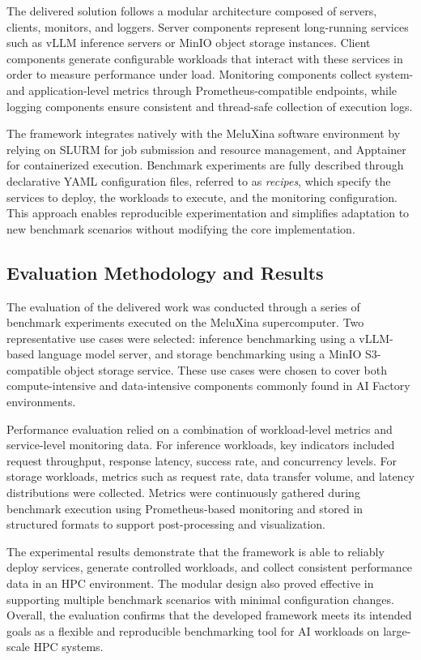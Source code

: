 \documentclass[11pt,a4paper]{article}
\begin{document}
The delivered solution follows a modular architecture composed of servers, clients, monitors, and loggers. Server components represent long-running services such as vLLM inference servers or MinIO object storage instances. Client components generate configurable workloads that interact with these services in order to measure performance under load. Monitoring components collect system- and application-level metrics through Prometheus-compatible endpoints, while logging components ensure consistent and thread-safe collection of execution logs.

The framework integrates natively with the MeluXina software environment by relying on SLURM for job submission and resource management, and Apptainer for containerized execution. Benchmark experiments are fully described through declarative YAML configuration files, referred to as \emph{recipes}, which specify the services to deploy, the workloads to execute, and the monitoring configuration. This approach enables reproducible experimentation and simplifies adaptation to new benchmark scenarios without modifying the core implementation.

\subsection{Evaluation Methodology and Results}

The evaluation of the delivered work was conducted through a series of benchmark experiments executed on the MeluXina supercomputer. Two representative use cases were selected: inference benchmarking using a vLLM-based language model server, and storage benchmarking using a MinIO S3-compatible object storage service. These use cases were chosen to cover both compute-intensive and data-intensive components commonly found in AI Factory environments.

Performance evaluation relied on a combination of workload-level metrics and service-level monitoring data. For inference workloads, key indicators included request throughput, response latency, success rate, and concurrency levels. For storage workloads, metrics such as request rate, data transfer volume, and latency distributions were collected. Metrics were continuously gathered during benchmark execution using Prometheus-based monitoring and stored in structured formats to support post-processing and visualization.

The experimental results demonstrate that the framework is able to reliably deploy services, generate controlled workloads, and collect consistent performance data in an HPC environment. The modular design also proved effective in supporting multiple benchmark scenarios with minimal configuration changes. Overall, the evaluation confirms that the developed framework meets its intended goals as a flexible and reproducible benchmarking tool for AI workloads on large-scale HPC systems.
\end{document}
